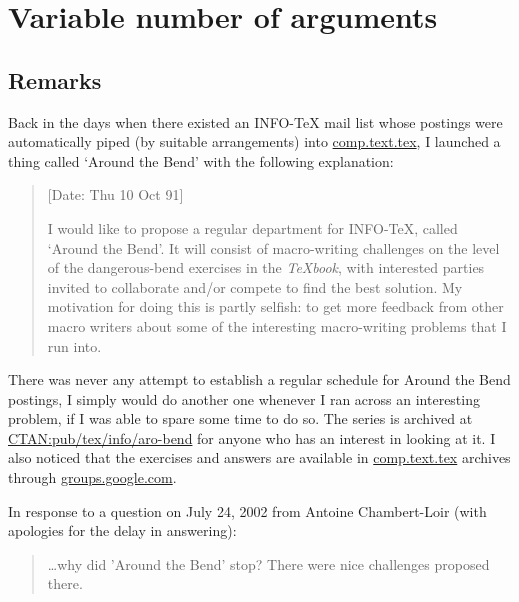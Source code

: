 

\chapter{Variable number of arguments}

\begin{comment}
\documentclass{memoir}
\usepackage{bend}
\usepackage{comment}
\usepackage{url}


\end{comment}

\section{Remarks}


Back in the days when 
there existed an INFO-TeX mail list whose postings were 
automatically piped (by suitable arrangements) into 
\url{comp.text.tex}, I launched a thing called `Around the Bend'
with the following explanation:
\begin{quote}
[Date: Thu 10 Oct 91]

I would like to propose a regular department for INFO-TeX, 
called `Around the Bend'.
It will 
consist of macro-writing challenges on the level of the 
dangerous-bend exercises
in the \emph{TeXbook}, 
with interested parties invited to 
collaborate and/or compete to find the best solution. My 
motivation for doing this is partly selfish: to get more  
feedback from other macro writers about some of the interesting 
macro-writing problems that I run into.
\end{quote}

  There was never any attempt to establish a regular schedule for 
Around the Bend postings, I simply would do another one whenever I ran across an 
interesting problem, if I was able to spare some time to do so. The 
series is archived at \url{CTAN:pub/tex/info/aro-bend}
for anyone who has an interest in looking at it. I also noticed that the 
exercises and answers are available in \url{comp.text.tex} archives 
through \url{groups.google.com}.

    In response to a question on July 24, 2002 from Antoine 
Chambert-Loir (with apologies for the delay in answering):
\begin{quote}
 \ldots why did 'Around the Bend' stop? 
There were nice challenges proposed there.
\end{quote}

